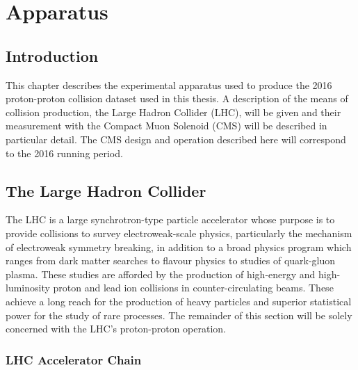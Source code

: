 \chapter{Apparatus}
\label{chap:apparatus}


\newpage

\section{Introduction}
This chapter describes the experimental apparatus used to produce the 2016 proton-proton collision dataset used in this thesis. A description of the means of collision production, the Large Hadron Collider (LHC), will be given and their measurement with the Compact Muon Solenoid (CMS) will be described in particular detail. The CMS design and operation described here will correspond to the 2016 running period.

\section{The Large Hadron Collider}
The LHC \cite{LHC_design_report} is a large synchrotron-type particle accelerator whose purpose is to provide collisions to survey electroweak-scale physics, particularly the mechanism of electroweak symmetry breaking, in addition to a broad physics program which ranges from dark matter searches to flavour physics to studies of quark-gluon plasma.
These studies are afforded by the production of high-energy and high-luminosity proton and lead ion collisions in counter-circulating beams. These achieve a long reach for the production of heavy particles and superior statistical power for the study of rare processes. 
The remainder of this section will be solely concerned with the LHC's proton-proton operation.  

\subsection{LHC Accelerator Chain}

